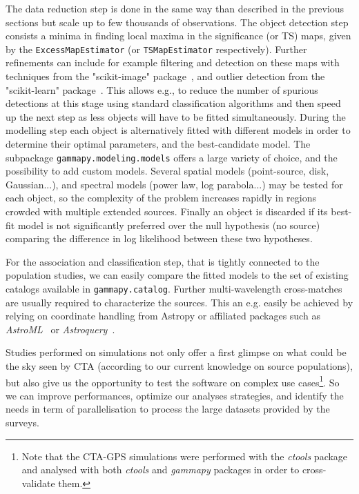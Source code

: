 \documentclass[traditabstract, longauth]{aa}
\newcommand{\code}[1]{\texttt{#1}}
\begin{document}
The \iacts data reduction step is done in the same way than described in the 
previous sections but scale up to few thousands of observations. The object
 detection step consists a minima in
finding local maxima in the significance (or TS) maps,  given by the
\code{ExcessMapEstimator} (or \code{TSMapEstimator} respectively).  Further refinements can
include for example  filtering and detection on these maps with techniques from
the "scikit-image" package~\citep{scikit-image}, and outlier detection from
the "scikit-learn" package~\citep{scikit-learn}. This allows e.g., to 
reduce the number of spurious detections at this stage using standard
classification algorithms and then speed up the next step
as less objects will have to be fitted simultaneously. During the modelling
step each object is alternatively fitted with different models in order to
determine their optimal parameters, and the best-candidate model. The
subpackage \code{gammapy.modeling.models} offers a large variety of choice, and the
possibility to add custom models.  Several spatial models (point-source, disk,
Gaussian...), and spectral models (power law, log parabola...) may be tested
for each object, so the complexity of the problem increases rapidly in regions
crowded with multiple extended sources. Finally an object is discarded if its
best-fit model is not significantly preferred over the null hypothesis (no
source) comparing the difference in log likelihood between these two
hypotheses.

For the association and classification step, that is tightly connected to the
population studies, we can easily compare the fitted models to the set of
existing \gammaray catalogs available in \code{gammapy.catalog}. Further
multi-wavelength cross-matches are usually required to characterize the
sources. This an e.g. easily be achieved by relying on coordinate
handling from Astropy or affiliated packages such as \textit{AstroML}~\citep{astroML}
or \textit{Astroquery}~\citep{astroquery}.

Studies performed on simulations not only offer a first glimpse on what could
be the sky seen by CTA (according to our current knowledge on source
populations), but also give us the opportunity to test the software on complex
use cases\footnote{Note that the CTA-GPS simulations were performed with the
	\textit{ctools} package~\citep{2016A&A...593A...1K} and analysed with both
	\textit{ctools} and \textit{gammapy} packages in order to cross-validate
	them.}. So we can  improve performances, optimize our analyses strategies, and
identify the needs in term of parallelisation to process the large datasets
provided by the surveys.
\end{document}
